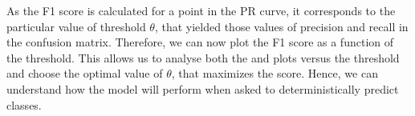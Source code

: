 As the F1 score is calculated for a point in the PR curve, it corresponds to the particular value of threshold $\theta$, that yielded those values of precision and recall in the confusion matrix.
Therefore, we can now plot the F1 score as a function of the threshold. 
This allows us to analyse both the \posF and \negF plots versus the threshold and choose the optimal value of $\theta$, that maximizes the \macroF score.
Hence, we can understand how the model will perform when asked to deterministically predict classes.

